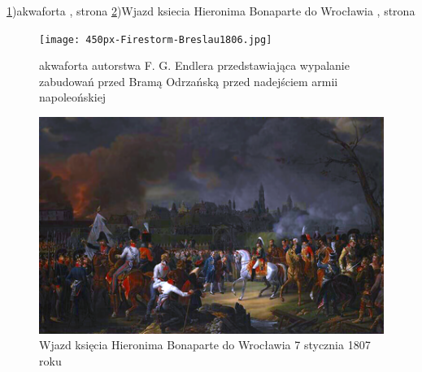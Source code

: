 \documentclass{article}
\begin{document}
\newline\ref{fig:akwaforta})akwaforta , strona \pageref{fig:akwaforta} 
\newline\ref{fig:wjazd})Wjazd ksiecia Hieronima Bonaparte do  Wrocławia , strona \pageref{fig:wjazd}
\begin{figure}[h!]
\centering
\texttt{[image: 450px-Firestorm-Breslau1806.jpg]}
\caption{akwaforta autorstwa F. G. Endlera przedstawiająca wypalanie zabudowań przed Bramą Odrzańską przed nadejściem armii napoleońskiej}
\label{fig:akwaforta}
\end{figure}

\begin{figure}[h!]
\centering
\includegraphics[scale=1.3]{450px-Entrée_du_Prince_Jérôme_à_Breslau_le_7_janvier_1807.png}
\caption{Wjazd księcia Hieronima Bonaparte do Wrocławia 7 stycznia 1807 roku}
\label{fig:wjazd}
\end{figure}










\newpage
\end{document}
